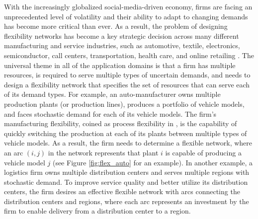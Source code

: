\documentclass{article} %
\newcommand{\lei}[1]{{\color{red}{\bf\sf [Lei: #1]}}}
\begin{document}
With the increasingly globalized social-media-driven economy, firms are facing an unprecedented level of volatility and their ability to adapt to changing demands has become more critical than ever. As a result, the problem of designing flexibility networks has become a key strategic decision across many different manufacturing and service industries, such as automotive, textile, electronics, semiconductor, call centers, transportation, health care, and online retailing \citep{chou2008process, simchi2010operations, wang2015process, asadpour2016online, devalve2018understanding, ledvina2020new}. The universal theme in all of the application domains is that a firm has multiple resources, is required to serve multiple types of uncertain demands, and needs to design a flexibility network that specifies the set of resources that can serve each of its demand types. For example, an auto-manufacturer owns multiple production plants (or production lines), produces a portfolio of vehicle models, and faces stochastic demand for each of its vehicle models. The firm's manufacturing flexibility, coined as process flexibility in \citet{JG95}, is the capability of quickly switching the production at each of its plants between multiple types of vehicle models. As a result, the firm needs to determine a flexible network, where an arc $(i,j)$ in the network represents that plant $i$ is capable of producing a vehicle model $j$ (see Figure \ref{fig:flex_auto} for an example). In another example, a logistics firm owns multiple distribution centers and serves multiple regions with stochastic demand. To improve service quality and better utilize its distribution centers, the firm desires an effective flexible network with arcs connecting the distribution centers and regions, where each arc represents an investment by the firm to enable delivery from a distribution center to a region. 






\end{document}
